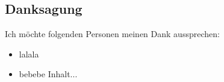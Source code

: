 \vspace*{\fill}
\begin{center}
\begin{minipage}{.4\textwidth}
\section*{Danksagung}
Ich möchte folgenden Personen meinen Dank aussprechen:\\

\begin{itemize}
\item[] lalala
\item[] bebebe
Inhalt...
\end{itemize}

\end{minipage}
\end{center}
\vfill %
\clearpage
